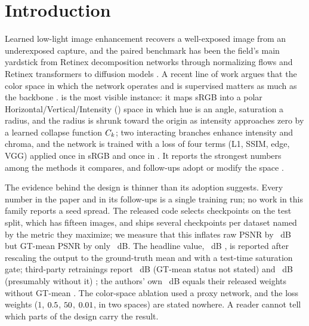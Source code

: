 \section{Introduction}
\label{sec:introduction}

Learned low-light image enhancement recovers a well-exposed image from an underexposed
capture, and the paired \dataset benchmark \citep{wei2018retinex} has been the field's main
yardstick from Retinex decomposition networks \citep{wei2018retinex, zhang2019kind} through
normalizing flows \citep{wang2022llflow} and Retinex transformers
\citep{cai2023retinexformer} to diffusion models \citep{hou2023gsad}. A recent line of work
argues that the color space in which the network operates and is supervised matters as much
as the backbone \citep{guo2023bread, brateanu2025lytnet, guan2025cstnet}. \mname
\citep{yan2025hvi} is the most visible instance: it maps sRGB into a polar
Horizontal/Vertical/Intensity (\hvi) space in which hue is an angle, saturation a radius, and
the radius is shrunk toward the origin as intensity approaches zero by a learned collapse
function $C_k$; two interacting branches enhance intensity and chroma, and the network is
trained with a loss of four terms (L1, SSIM, edge, VGG) applied once in sRGB and once in
\hvi. It reports the strongest \dataset numbers among the methods it compares, and follow-ups
adopt or modify the space \citep{shi2025fusionnet, yang2026rhvifdd, ai2026bcihv,
cheng2026vcr, wang2026haimnet}.

The evidence behind the design is thinner than its adoption suggests. Every number in the
paper and in its follow-ups is a single training run; no work in this family reports a seed
spread. The released code selects checkpoints on the \dataset test split, which has fifteen
images, and ships several checkpoints per dataset named by the metric they maximize; we
measure that this inflates raw PSNR by ~dB but GT-mean PSNR by only
~dB. The headline \dataset value, ~dB \citep{yan2025hvi}, is reported after
rescaling the output to the ground-truth mean and with a test-time saturation gate; third-party retrainings report ~dB (GT-mean status not stated)
\citep{li2026pal} and ~dB (presumably without it) \citep{hvicidnet_issue66}; the authors' own
~dB \citep{shi2025fusionnet} equals their released weights without GT-mean
\citep{hvicidnet_readme}. The color-space ablation used a proxy network, and the loss weights
($1$, $0.5$, $50$, $0.01$, in two spaces) are stated nowhere. A reader cannot tell which parts of the design carry the result.

